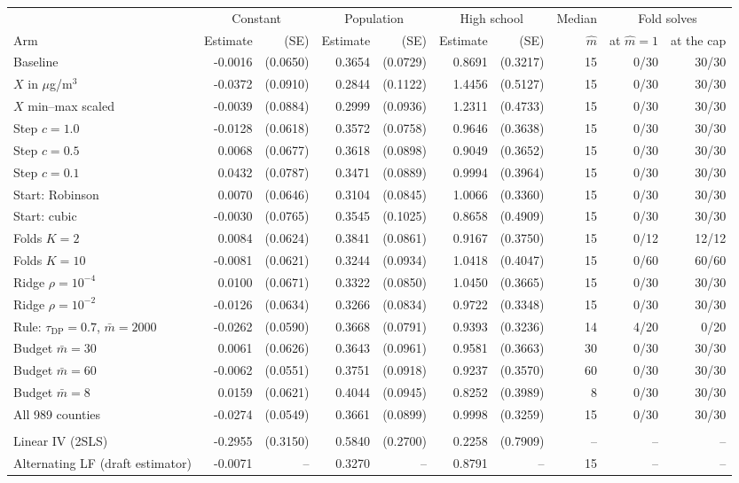 \begin{tabular}{lrrrrrrrrr}
\toprule
& \multicolumn{2}{c}{Constant} & \multicolumn{2}{c}{Population} & \multicolumn{2}{c}{High school} & Median & \multicolumn{2}{c}{Fold solves} \\
\cmidrule(lr){2-3} \cmidrule(lr){4-5} \cmidrule(lr){6-7} \cmidrule(lr){9-10}
Arm & Estimate & (SE) & Estimate & (SE) & Estimate & (SE) & $\hat m$ & at $\hat m = 1$ & at the cap \\
\midrule
Baseline & -0.0016 & (0.0650) & 0.3654 & (0.0729) & 0.8691 & (0.3217) & 15 & 0/30 & 30/30 \\
$X$ in $\mu$g/m$^3$ & -0.0372 & (0.0910) & 0.2844 & (0.1122) & 1.4456 & (0.5127) & 15 & 0/30 & 30/30 \\
$X$ min--max scaled & -0.0039 & (0.0884) & 0.2999 & (0.0936) & 1.2311 & (0.4733) & 15 & 0/30 & 30/30 \\
Step $c = 1.0$ & -0.0128 & (0.0618) & 0.3572 & (0.0758) & 0.9646 & (0.3638) & 15 & 0/30 & 30/30 \\
Step $c = 0.5$ & 0.0068 & (0.0677) & 0.3618 & (0.0898) & 0.9049 & (0.3652) & 15 & 0/30 & 30/30 \\
Step $c = 0.1$ & 0.0432 & (0.0787) & 0.3471 & (0.0889) & 0.9994 & (0.3964) & 15 & 0/30 & 30/30 \\
Start: Robinson & 0.0070 & (0.0646) & 0.3104 & (0.0845) & 1.0066 & (0.3360) & 15 & 0/30 & 30/30 \\
Start: cubic & -0.0030 & (0.0765) & 0.3545 & (0.1025) & 0.8658 & (0.4909) & 15 & 0/30 & 30/30 \\
Folds $K = 2$ & 0.0084 & (0.0624) & 0.3841 & (0.0861) & 0.9167 & (0.3750) & 15 & 0/12 & 12/12 \\
Folds $K = 10$ & -0.0081 & (0.0621) & 0.3244 & (0.0934) & 1.0418 & (0.4047) & 15 & 0/60 & 60/60 \\
Ridge $\rho = 10^{-4}$ & 0.0100 & (0.0671) & 0.3322 & (0.0850) & 1.0450 & (0.3665) & 15 & 0/30 & 30/30 \\
Ridge $\rho = 10^{-2}$ & -0.0126 & (0.0634) & 0.3266 & (0.0834) & 0.9722 & (0.3348) & 15 & 0/30 & 30/30 \\
Rule: $\tau_{\mathrm{DP}} = 0.7$, $\bar m = 2000$ & -0.0262 & (0.0590) & 0.3668 & (0.0791) & 0.9393 & (0.3236) & 14 & 4/20 & 0/20 \\
Budget $\bar m = 30$ & 0.0061 & (0.0626) & 0.3643 & (0.0961) & 0.9581 & (0.3663) & 30 & 0/30 & 30/30 \\
Budget $\bar m = 60$ & -0.0062 & (0.0551) & 0.3751 & (0.0918) & 0.9237 & (0.3570) & 60 & 0/30 & 30/30 \\
Budget $\bar m = 8$ & 0.0159 & (0.0621) & 0.4044 & (0.0945) & 0.8252 & (0.3989) & 8 & 0/30 & 30/30 \\
All 989 counties & -0.0274 & (0.0549) & 0.3661 & (0.0899) & 0.9998 & (0.3259) & 15 & 0/30 & 30/30 \\
\addlinespace
\multicolumn{10}{l}{\textit{Comparison estimators}} \\
Linear IV (2SLS) & -0.2955 & (0.3150) & 0.5840 & (0.2700) & 0.2258 & (0.7909) & -- & -- & -- \\
Alternating LF (draft estimator) & -0.0071 & -- & 0.3270 & -- & 0.8791 & -- & 15 & -- & -- \\
\bottomrule
\end{tabular}
